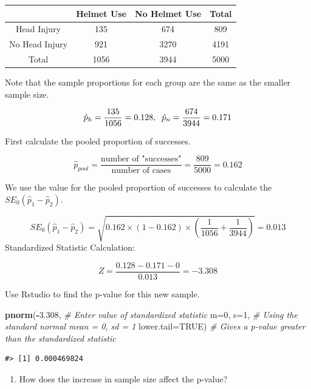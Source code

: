 \documentclass[
]{report}
\newenvironment{Shaded}{\begin{snugshade}}{\end{snugshade}}
\newcommand{\AttributeTok}[1]{\textcolor[rgb]{0.13,0.29,0.53}{#1}}
\newcommand{\CommentTok}[1]{\textcolor[rgb]{0.56,0.35,0.01}{\textit{#1}}}
\newcommand{\ConstantTok}[1]{\textcolor[rgb]{0.56,0.35,0.01}{#1}}
\newcommand{\DecValTok}[1]{\textcolor[rgb]{0.00,0.00,0.81}{#1}}
\newcommand{\FloatTok}[1]{\textcolor[rgb]{0.00,0.00,0.81}{#1}}
\newcommand{\FunctionTok}[1]{\textcolor[rgb]{0.13,0.29,0.53}{\textbf{#1}}}
\newcommand{\NormalTok}[1]{#1}
\newcommand{\SpecialCharTok}[1]{\textcolor[rgb]{0.81,0.36,0.00}{\textbf{#1}}}
\providecommand{\tightlist}{%
  \setlength{\itemsep}{0pt}\setlength{\parskip}{0pt}}
\begin{document}
\begin{longtable}[]{@{}cccc@{}}
\toprule\noalign{}
& Helmet Use & No Helmet Use & Total \\
\midrule\noalign{}
\endhead
\bottomrule\noalign{}
\endlastfoot
Head Injury & 135 & 674 & 809 \\
No Head Injury & 921 & 3270 & 4191 \\
Total & 1056 & 3944 & 5000 \\
\end{longtable}

Note that the sample proportions for each group are the same as the smaller sample size.

\[\hat{p}_h = \frac{135}{1056}=0.128, \hspace{2mm} \hat{p}_n = \frac{674}{3944}=0.171\]

First calculate the pooled proportion of successes.

\[\hat{p}_{pool} = \frac{\text{number of "successes"}}{\text{number of cases}} = \frac{809}{5000} = 0.162\]

We use the value for the pooled proportion of successes to calculate the \(SE_0(\hat{p}_1 - \hat{p}_2)\).

\[
SE_0(\hat{p}_1-\hat{p}_2)=\sqrt{0.162 \times (1-0.162)\times \left(\frac{1}{1056}+\frac{1}{3944}\right)} = 0.013
\]
Standardized Statistic Calculation:

\[Z = \frac{0.128 - 0.171 - 0}{0.013} = -3.308\]

Use Rstudio to find the p-value for this new sample.

\begin{Shaded}
\begin{Highlighting}[]
\FunctionTok{pnorm}\NormalTok{(}\SpecialCharTok{{-}}\FloatTok{3.308}\NormalTok{, }\CommentTok{\# Enter value of standardized statistic}
      \AttributeTok{m=}\DecValTok{0}\NormalTok{, }\AttributeTok{s=}\DecValTok{1}\NormalTok{, }\CommentTok{\# Using the standard normal mean = 0, sd = 1}
      \AttributeTok{lower.tail=}\ConstantTok{TRUE}\NormalTok{) }\CommentTok{\# Gives a p{-}value greater than the standardized statistic}
\end{Highlighting}
\end{Shaded}

\begin{verbatim}
#> [1] 0.000469824
\end{verbatim}

\begin{enumerate}
\def\labelenumi{\arabic{enumi}.}
\setcounter{enumi}{9}
\tightlist
\item
  How does the increase in sample size affect the p-value?
\end{enumerate}
\end{document}
